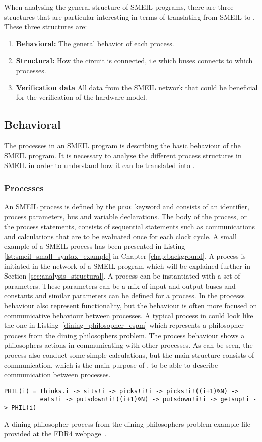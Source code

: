 When analysing the general structure of SMEIL programs, there are three structures that are particular interesting in terms of translating from SMEIL to \cspm{}. These three structures are:
\begin{enumerate}
    \item \textbf{Behavioral:} The general behavior of each process.
    \item \textbf{Structural:} How the circuit is connected, i.e which buses connects to which processes.
    \item \textbf{Verification data} All data from the SMEIL network that could be beneficial for the verification of the hardware model.
\end{enumerate}
\subsection{Behavioral}
The processes in an SMEIL program is describing the basic behaviour of the SMEIL program. It is necessary to analyse the different process structures in SMEIL in order to understand how it can be translated into \cspm{}.
\subsubsection{Processes}
An SMEIL process is defined by the \texttt{proc} keyword and consists of an identifier, process parameters, bus and variable declarations. The body of the process, or the process statements, consists of sequential statements such as communications and calculations that are to be evaluated once for each clock cycle. A small example of a SMEIL process has been presented in Listing \ref{lst:smeil_small_syntax_example} in Chapter \ref{chap:background}. A process is initiated in the network of a SMEIL program which will be explained further in Section \ref{sec:analysis_structural}. A process can be instantiated with a set of parameters. These parameters can be a mix of input and output buses and constants and similar parameters can be defined for a \cspm{} process. In \cspm{} the processs behaviour also represent functionality, but the behaviour is often more focused on communicative behaviour between processes.
A typical process in \cspm{} could look like the one in Listing~\ref{dining_philosopher_cspm} which represents a philosopher process from the dining philosophers problem. The process behaviour shows a philosophers actions in communicating with other processes. As can be seen, the process also conduct some simple calculations, but the main structure consists of communication, which is the main purpose of \cspm{}, to be able to describe communication between processes.
\begin{listing}
\begin{verbatim}
PHIL(i) = thinks.i -> sits!i -> picks!i!i -> picks!i!((i+1)%N) ->
          eats!i -> putsdown!i!((i+1)%N) -> putsdown!i!i -> getsup!i -> PHIL(i)

\end{verbatim}
\caption{A dining philosopher process from the dining philosophers problem example file provided at the FDR4 webpage~\cite{fdr_example}.}
\label{dining_philosopher_cspm}
\end{listing}

